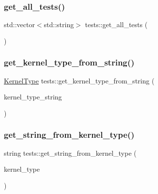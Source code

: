 \subsubsection{\texorpdfstring{get\+\_\+all\+\_\+tests()}{get\_all\_tests()}}
{\footnotesize\ttfamily std\+::vector$<$std\+::string$>$ tests\+::get\+\_\+all\+\_\+tests (\begin{DoxyParamCaption}{ }\end{DoxyParamCaption})}

\mbox{\label{namespacetests_a6596994244a2884f6810ad1592c25c36}} 
\subsubsection{\texorpdfstring{get\+\_\+kernel\+\_\+type\+\_\+from\+\_\+string()}{get\_kernel\_type\_from\_string()}}
{\footnotesize\ttfamily \hyperlink{namespacetests_a4f360b8af533762256ff97513bfd6a0d}{Kernel\+Type} tests\+::get\+\_\+kernel\+\_\+type\+\_\+from\+\_\+string (\begin{DoxyParamCaption}\item[{string}]{kernel\+\_\+type\+\_\+string }\end{DoxyParamCaption})}

\mbox{\label{namespacetests_ad75f85658266305d587bfb6795c1922e}} 
\subsubsection{\texorpdfstring{get\+\_\+string\+\_\+from\+\_\+kernel\+\_\+type()}{get\_string\_from\_kernel\_type()}}
{\footnotesize\ttfamily string tests\+::get\+\_\+string\+\_\+from\+\_\+kernel\+\_\+type (\begin{DoxyParamCaption}\item[{\hyperlink{namespacetests_a4f360b8af533762256ff97513bfd6a0d}{Kernel\+Type}}]{kernel\+\_\+type }\end{DoxyParamCaption})}

